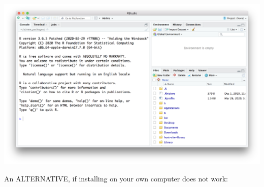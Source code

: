 \documentclass[]{book}
\begin{document}
\includegraphics[width=33.36in]{images/RStudio-screenshot}

An ALTERNATIVE, if installing on your own computer does not work:
\end{document}
